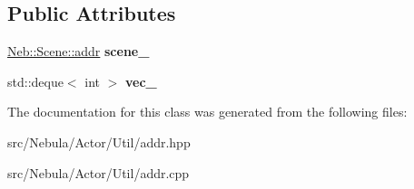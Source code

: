 \subsection*{\-Public \-Attributes}
\begin{DoxyCompactItemize}
\item 
\hypertarget{classNeb_1_1Actor_1_1addr_a04a145dc150d8c35e0a886e041c8abc7}{\hyperlink{classNeb_1_1Scene_1_1addr}{\-Neb\-::\-Scene\-::addr} {\bfseries scene\-\_\-}}\label{classNeb_1_1Actor_1_1addr_a04a145dc150d8c35e0a886e041c8abc7}

\item 
\hypertarget{classNeb_1_1Actor_1_1addr_a11c7c7917c7d4b4ccf3dd5bed5d801d1}{std\-::deque$<$ int $>$ {\bfseries vec\-\_\-}}\label{classNeb_1_1Actor_1_1addr_a11c7c7917c7d4b4ccf3dd5bed5d801d1}

\end{DoxyCompactItemize}


\-The documentation for this class was generated from the following files\-:\begin{DoxyCompactItemize}
\item 
src/\-Nebula/\-Actor/\-Util/addr.\-hpp\item 
src/\-Nebula/\-Actor/\-Util/addr.\-cpp\end{DoxyCompactItemize}

